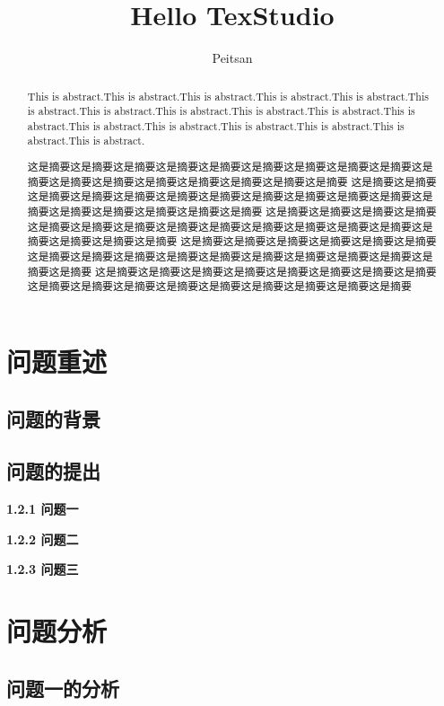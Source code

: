 \documentclass[]{article}   %
\title{Hello TexStudio}  %
\author{Peitsan}    %
\begin{document}
	\maketitle
	\begin{abstract}  %
		This is abstract.This is abstract.This is abstract.This is abstract.This is abstract.This is abstract.This is abstract.This is abstract.This is abstract.This is abstract.This is abstract.This is abstract.This is abstract.This is abstract.This is abstract.This is abstract.This is abstract.
		
		
		这是摘要这是摘要这是摘要这是摘要这是摘要这是摘要这是摘要这是摘要这是摘要这是摘要这是摘要这是摘要这是摘要这是摘要这是摘要这是摘要这是摘要	这是摘要这是摘要这是摘要这是摘要这是摘要这是摘要这是摘要这是摘要这是摘要这是摘要这是摘要这是摘要这是摘要这是摘要这是摘要这是摘要这是摘要	这是摘要这是摘要这是摘要这是摘要这是摘要这是摘要这是摘要这是摘要这是摘要这是摘要这是摘要这是摘要这是摘要这是摘要这是摘要这是摘要这是摘要	这是摘要这是摘要这是摘要这是摘要这是摘要这是摘要这是摘要这是摘要这是摘要这是摘要这是摘要这是摘要这是摘要这是摘要这是摘要这是摘要这是摘要	这是摘要这是摘要这是摘要这是摘要这是摘要这是摘要这是摘要这是摘要这是摘要这是摘要这是摘要这是摘要这是摘要这是摘要这是摘要这是摘要这是摘要
	\end{abstract}

\newpage

	\tableofcontents %
	
\newpage
	\section{问题重述}
		\subsection{问题的背景}
		\subsection{问题的提出}
		
			\noindent\textbf{1.2.1 问题一}
			
			\noindent\textbf{1.2.2 问题二}
			
			\noindent\textbf{1.2.3 问题三}
			
	\section{问题分析}
		\subsection{问题一的分析}
\end{document}
